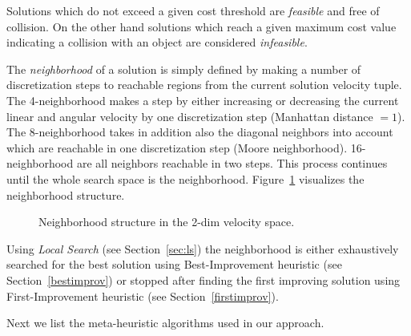 Solutions which do not exceed a given cost threshold are \emph{feasible} and free of collision. 
On the other hand solutions which reach a given maximum cost value indicating a collision with an object are considered \emph{infeasible}.

The \emph{neighborhood} of a solution is simply defined by making a number of discretization steps to reachable regions from the current solution velocity tuple. 
The 4-neighborhood makes a step by either increasing or decreasing the current linear and angular velocity by one discretization step (Manhattan distance $=1$). 
The 8-neighborhood takes in addition also the diagonal neighbors into account which are reachable in one discretization step (Moore neighborhood). 
16-neighborhood are all neighbors reachable in two steps. 
This process continues until the whole search space is the neighborhood. Figure~\ref{fig:fig_nb} visualizes the neighborhood structure.
\begin{figure}[thpb]
   \footnotesize
   \centering
   \def\svgwidth{\textwidth}
        
   \caption[]{Neighborhood structure in the 2-dim velocity space.}
   \label{fig:fig_nb}
\end{figure}

Using \emph{Local Search} (see Section~\ref{sec:ls}) the neighborhood is either exhaustively searched for the best solution using Best-Improvement heuristic (see Section~\ref{bestimprov}) or stopped after finding the first improving solution using First-Improvement heuristic (see Section~\ref{firstimprov}).

Next we list the meta-heuristic algorithms used in our approach.


